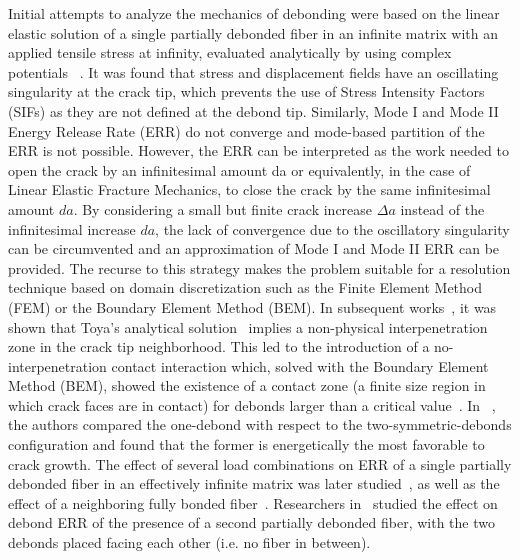 Initial attempts to analyze the mechanics of debonding were based on the linear elastic solution of a single partially debonded fiber in an infinite matrix with an applied tensile stress at infinity, evaluated analytically by using complex potentials ~\cite{England1966,Perlman1967,Toya1974}. It was found that stress and displacement fields have an oscillating singularity at the crack tip, which prevents the use of Stress Intensity Factors (SIFs) as they are not defined at the debond tip. Similarly, Mode I and Mode II Energy Release Rate (ERR) do not converge and mode-based partition of the ERR is not possible. However, the ERR can be interpreted as the work needed to open the crack by an infinitesimal amount da or equivalently, in the case of Linear Elastic Fracture Mechanics, to close the crack by the same infinitesimal amount $da$. By considering a small but finite crack increase $\Delta a$ instead of the infinitesimal increase $da$, the lack of convergence due to the oscillatory singularity can be circumvented and an approximation of Mode I and Mode II ERR can be provided. The recurse to this strategy makes the problem suitable for a resolution technique based on domain discretization such as the Finite Element Method (FEM) or the Boundary Element Method (BEM). In subsequent works~\cite{Paris1996,Varna1997a}, it was shown that Toya’s analytical solution~\cite{Toya1974} implies a non-physical interpenetration zone in the crack tip neighborhood. This led to the introduction of a no-interpenetration contact interaction which, solved with the Boundary Element Method (BEM), showed the existence of a contact zone (a finite size region in which crack faces are in contact) for debonds larger than a critical value~\cite{Varna1997a}. In ~\cite{Garcia2015}, the authors compared the one-debond with respect to the two-symmetric-debonds configuration and found that the former is energetically the most favorable to crack growth. The effect of several load combinations on ERR of a single partially debonded fiber in an effectively infinite matrix was later studied~\cite{Correa2007,Correa2013,Correa2014}, as well as the effect of a neighboring fully bonded fiber~\cite{Sandino2016,Zhuang2018}. Researchers in~\cite{Varna2017} studied the effect on debond ERR of the presence of a second partially debonded fiber, with the two debonds placed facing each other (i.e. no fiber in between).\\
